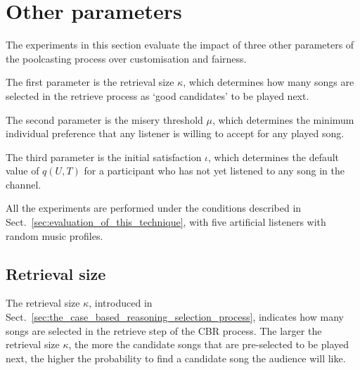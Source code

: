 

\section{Other parameters} %
\label{sec:other_parameters}

The experiments in this section evaluate the impact of three other parameters of the poolcasting process over customisation and fairness. 

The first parameter is the retrieval size $\kappa$, which determines how many songs are selected in the retrieve process as `good candidates' to be played next. %

The second parameter is the misery threshold $\mu$, which determines the minimum individual preference that any listener is willing to accept for any played song.

The third parameter is the initial satisfaction $\iota$, which determines the default value of $q(U,T)$ for a participant who has not yet listened to any song in the channel. 

All the experiments are performed under the conditions described in Sect.~\ref{sec:evaluation_of_this_technique}, with five artificial listeners with random music profiles.

 


\subsection{Retrieval size} %
\label{sub:retrieval_size}

The retrieval size $\kappa$, introduced in Sect.~\ref{sec:the_case_based_reasoning_selection_process}, indicates how many songs are selected in the retrieve step of the CBR process.
The larger the retrieval size $\kappa$, the more the candidate songs that are pre-selected to be played next, the higher the probability to find a candidate song the audience will like.

